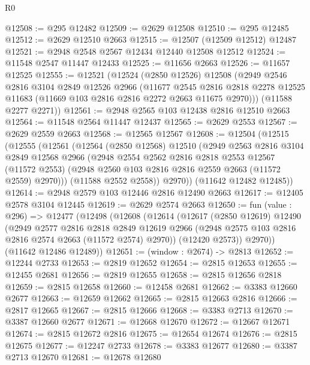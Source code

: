 \begin{lexlean}{R0}
\begin{coremodule}
@12508 := @295 @12482
@12509 := @2629 @12508
@12510 := @295 @12485
@12512 := @2629 @12510 @2663
@12515 := @12507 (@12509 @12512) @12487
@12521 := @2948 @2548 @2567 @12434 @12440 @12508 @12512
@12524 := @11548 @2547 @11447 @12433
@12525 := @11656 @2663
@12526 := @11657 @12525
@12555 := @12521
    (@12524
      (@2850 @12526)
      @12508
      (@2949
        @2546
        @2816
        @3104
        @2849
        @12526
        @2966
        (@11677
          @2545
          @2816
          @2818
          @2278
          @12525
          @11683
          (@11669 @103 @2816 @2816 @2272 @2663 @11675 @2970)))
      (@11588 @2277 @2271))
@12561 := @2948 @2565 @103 @12438 @2816 @12510 @2663
@12564 := @11548 @2564 @11447 @12437
@12565 := @2629 @2553
@12567 := @2629 @2559 @2663
@12568 := @12565 @12567
@12608 := @12504
    (@12515
      (@12555
        (@12561
          (@12564
            (@2850 @12568)
            @12510
            (@2949
              @2563
              @2816
              @3104
              @2849
              @12568
              @2966
              (@2948
                @2554
                @2562
                @2816
                @2818
                @2553
                @12567
                (@11572 @2553)
                (@2948 @2560 @103 @2816 @2816 @2559 @2663 (@11572 @2559) @2970)))
            (@11588 @2552 @2558))
          @2970))
      (@11642 @12482 @12485))
@12614 := @2948 @2579 @103 @12446 @2816 @12490 @2663
@12617 := @12405 @2578 @3104 @12445
@12619 := @2629 @2574 @2663
@12650 := fun (value : @296) =>
  @12477
    (@12498
      (@12608
        (@12614
          (@12617
            (@2850 @12619)
            @12490
            (@2949
              @2577
              @2816
              @2818
              @2849
              @12619
              @2966
              (@2948 @2575 @103 @2816 @2816 @2574 @2663 (@11572 @2574) @2970))
            (@12420 @2573))
          @2970))
      (@11642 @12486 @12489))
@12651 := (window : @2674) -> @2813
@12652 := @12244 @2733
@12653 := @2819 @12652
@12654 := @2815 @12653
@12655 := @12455 @2681
@12656 := @2819 @12655
@12658 := @2815 @12656 @2818
@12659 := @2815 @12658
@12660 := @12458 @2681
@12662 := @3383 @12660 @2677
@12663 := @12659 @12662
@12665 := @2815 @12663 @2816
@12666 := @2817 @12665
@12667 := @2815 @12666
@12668 := @3383 @2713
@12670 := @3387 @12660 @2677
@12671 := @12668 @12670
@12672 := @12667 @12671
@12674 := @2815 @12672 @2816
@12675 := @12654 @12674
@12676 := @2815 @12675
@12677 := @12247 @2733
@12678 := @3383 @12677
@12680 := @3387 @2713 @12670
@12681 := @12678 @12680

\end{coremodule}
\end{lexlean}
